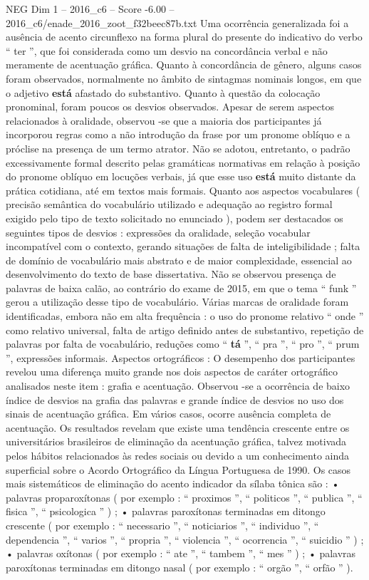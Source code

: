 \begin{textsample}{NEG Dim 1 – 2016\_c6 – Score -6.00 – 2016\_c6/enade\_2016\_zoot\_f32beec87b.txt}
Uma ocorrência generalizada foi a ausência de acento circunflexo na forma plural do presente do indicativo do verbo “ ter ”, que foi considerada como um desvio na concordância verbal e não meramente de acentuação gráfica.
Quanto à concordância de gênero, alguns casos foram observados, normalmente no âmbito de sintagmas nominais longos, em que o adjetivo \textbf{está} afastado do substantivo.
Quanto à questão da colocação pronominal, foram poucos os desvios observados.
Apesar de serem aspectos relacionados à oralidade, observou -se que a maioria dos participantes já incorporou regras como a não introdução da frase por um pronome oblíquo e a próclise na presença de um termo atrator.
Não se adotou, entretanto, o padrão excessivamente formal descrito pelas gramáticas normativas em relação à posição do pronome oblíquo em locuções verbais, já que esse uso \textbf{está} muito distante da prática cotidiana, até em textos mais formais.
Quanto aos aspectos vocabulares ( precisão semântica do vocabulário utilizado e adequação ao registro formal exigido pelo tipo de texto solicitado no enunciado ), podem ser destacados os seguintes tipos de desvios : expressões da oralidade, seleção vocabular incompatível com o contexto, gerando situações de falta de inteligibilidade ; falta de domínio de vocabulário mais abstrato e de maior complexidade, essencial ao desenvolvimento do texto de base dissertativa.
Não se observou presença de palavras de baixa calão, ao contrário do exame de 2015, em que o tema “ funk ” gerou a utilização desse tipo de vocabulário.
Várias marcas de oralidade foram identificadas, embora não em alta frequência : o uso do pronome relativo “ onde ” como relativo universal, falta de artigo definido antes de substantivo, repetição de palavras por falta de vocabulário, reduções como “ \textbf{tá} ”, “ pra ”, “ pro ”, “ prum ”, expressões informais.
Aspectos ortográficos : O desempenho dos participantes revelou uma diferença muito grande nos dois aspectos de caráter ortográfico analisados neste item : grafia e acentuação.
Observou -se a ocorrência de baixo índice de desvios na grafia das palavras e grande índice de desvios no uso dos sinais de acentuação gráfica.
Em vários casos, ocorre ausência completa de acentuação.
Os resultados revelam que existe uma tendência crescente entre os universitários brasileiros de eliminação da acentuação gráfica, talvez motivada pelos hábitos relacionados às redes sociais ou devido a um conhecimento ainda superficial sobre o Acordo Ortográfico da Língua Portuguesa de 1990.
Os casos mais sistemáticos de eliminação do acento indicador da sílaba tônica são : • palavras proparoxítonas ( por exemplo : “ proximos ”, “ politicos ”, “ publica ”, “ fisica ”, “ psicologica ” ) ; • palavras paroxítonas terminadas em ditongo crescente ( por exemplo : “ necessario ”, “ noticiarios ”, “ individuo ”, “ dependencia ”, “ varios ”, “ propria ”, “ violencia ”, “ ocorrencia ”, “ suicidio ” ) ; • palavras oxítonas ( por exemplo : “ ate ”, “ tambem ”, “ mes ” ) ; • palavras paroxítonas terminadas em ditongo nasal ( por exemplo : “ orgão ”, “ orfão ” ).

\end{textsample}
